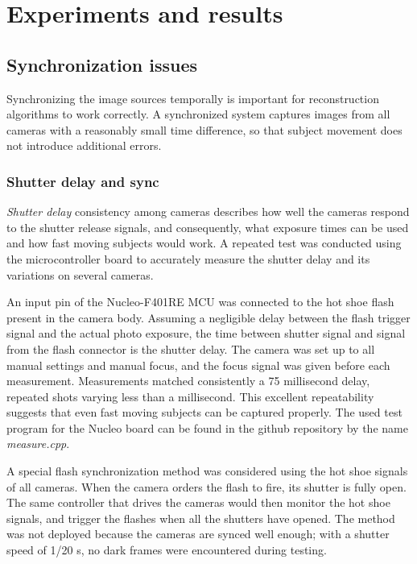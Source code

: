 \section{Experiments and results} \label{sec:experiments}


\subsection{Synchronization issues}

Synchronizing the image sources temporally is important for reconstruction algorithms to work correctly.
A synchronized system captures images from all cameras with a reasonably small time difference, so that subject movement does not introduce additional errors.

\subsubsection{Shutter delay and sync} \label{sec:shutterdelaymeas}

\emph{Shutter delay} consistency among cameras describes how well the cameras respond to the shutter release signals, and consequently, what exposure times can be used and how fast moving subjects would work.
A repeated test was conducted using the microcontroller board to accurately measure the shutter delay and its variations on several cameras.

An input pin of the Nucleo-F401RE MCU was connected to the hot shoe flash present in the camera body.
Assuming a negligible delay between the flash trigger signal and the actual photo exposure, the time between shutter signal and signal from the flash connector is the shutter delay.
The camera was set up to all manual settings and manual focus, and the focus signal was given before each measurement.
Measurements matched consistently a 75 millisecond delay, repeated shots varying less than a millisecond.
This excellent repeatability suggests that even fast moving subjects can be captured properly.
The used test program for the Nucleo board can be found in the github repository by the name \emph{measure.cpp}.

A special flash synchronization method was considered using the hot shoe signals of all cameras.
When the camera orders the flash to fire, its shutter is fully open.
The same controller that drives the cameras would then monitor the hot shoe signals, and trigger the flashes when all the shutters have opened.
The method was not deployed because the cameras are synced well enough; with a shutter speed of 1/20 s, no dark frames were encountered during testing.

